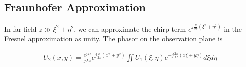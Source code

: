 \documentclass{article}
\begin{document}
\subsection{Fraunhofer Approximation}

In far field $z \gg \xi^2 + \eta^2$, we can approximate the chirp term $e^{j\frac{k}{2z}(\xi^2 + \eta^2)}$ 
in the Fresnel approximation as unity. The phasor on the observation plane is

\begin{align}
    U_2(x, y) = \frac{e^{jkz}}{j\lambda z} e^{j\frac{k}{2z}(x^2+y^2)} 
    \iint U_1(\xi,\eta) e^{-j\frac{2\pi}{\lambda z}(x\xi + y\eta)}d\xi d\eta
\end{align}
\end{document}
